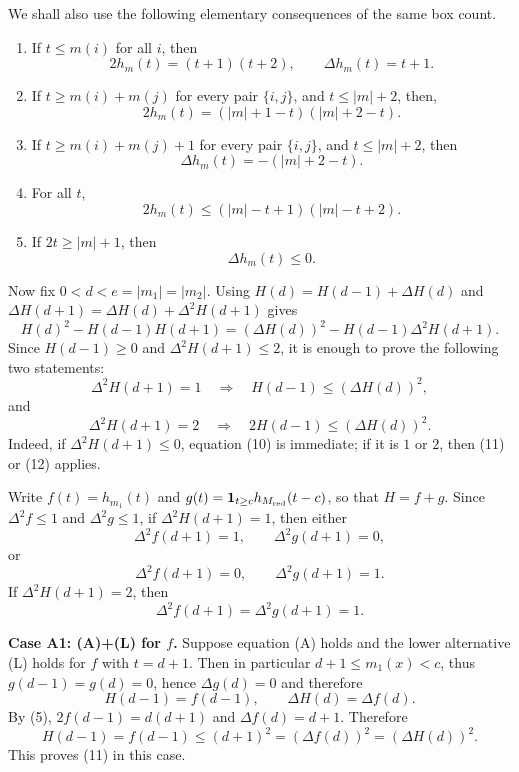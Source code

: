 We shall also use the following elementary consequences of the same box
count. 
\begin{enumerate}
    \item If $t\le m(i)$ for all $i$, then
\[
  2h_m(t)=(t+1)(t+2),
  \qquad
  \Delta h_m(t)=t+1.                                      \tag{5}
\]
\item If $t\ge m(i)+m(j)$ for every pair $\{i,j\}$,
and $t\le |m|+2$,
then,
\[
  2h_m(t)=(|m|+1-t)(|m|+2-t).                              \tag{6}
\]
\item If $t\ge m(i)+m(j)+1$ for every pair $\{i,j\}$,
and $t\le |m|+2$, then 
\[
  \Delta h_m(t)=-(|m|+2-t).                                \tag{7}
\]
\item For all $t$,
\[
  2h_m(t)\le (|m|-t+1)(|m|-t+2).                           \tag{8}
\]
\item If $2t\ge |m|+1$, then
\[
  \Delta h_m(t)\le0.                                      \tag{9}
\]
\end{enumerate}
Now fix $0<d<e=|m_1|=|m_2|$. Using $H(d)=H(d-1)+\Delta H(d)$
and $\Delta H(d+1)=\Delta H(d)+\Delta^2H(d+1)$
gives
\[
  H(d)^2-H(d-1)H(d+1)
  =
  (\Delta H(d))^2-H(d-1)\Delta^2H(d+1).                   \tag{10}
\]
Since $H(d-1)\ge0$ and $\Delta^2H(d+1)\le2$, it is enough to prove the following two statements:
\[
  \Delta^2H(d+1)=1
  \quad\Longrightarrow\quad
  H(d-1)\le(\Delta H(d))^2,                               \tag{11}
\]
and
\[
  \Delta^2H(d+1)=2
  \quad\Longrightarrow\quad
  2H(d-1)\le(\Delta H(d))^2.                              \tag{12}
\]
Indeed, if $\Delta^2H(d+1)\le0$, equation (10) is immediate; if it is
$1$ or $2$, then (11) or (12) applies.

Write $f(t)=h_{m_1}(t)$ and $g(t)=\mathbf 1_{t\ge c}h_{M_{\rm red}}(t-c)$, so that $H=f+g$.
Since $\Delta^2f\le1$ and $\Delta^2g\le1$, if
$\Delta^2H(d+1)=1$, then either
\[
  \Delta^2f(d+1)=1,
  \qquad
  \Delta^2g(d+1)=0,                                      \tag{A}
\]
or
\[
  \Delta^2f(d+1)=0,
  \qquad
  \Delta^2g(d+1)=1.                                      \tag{B}
\]
If $\Delta^2H(d+1)=2$, then
\[
  \Delta^2f(d+1)=\Delta^2g(d+1)=1.
  \tag{C}
\]

\medskip
\noindent\textbf{Case A1: (A)+(L) for $f$.}
Suppose equation (A) holds and the lower alternative (L) holds for $f$ with $t=d+1$. Then in particular $d+1\le m_1(x)<c$, thus $g(d-1)=g(d)=0$, hence $\Delta g(d)=0$ and therefore
\[
  H(d-1)=f(d-1),
  \qquad
  \Delta H(d)=\Delta f(d).
\]
By (5), $2f(d-1)=d(d+1)$ and $\Delta f(d)=d+1$. 
Therefore
\[
  H(d-1)=f(d-1)\le(d+1)^2=(\Delta f(d))^2=(\Delta H(d))^2.
\]
This proves (11) in this case.

